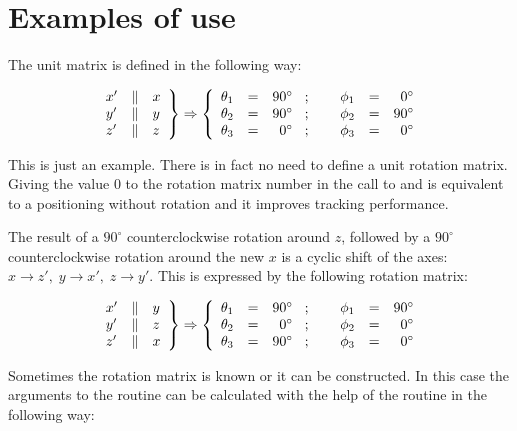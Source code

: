 \section*{Examples of use}
The unit matrix is defined in the following way:

\[
\left . \begin{array}{lcl}
x' & \| & x \\
y' & \| & y \\
z' & \| & z
\end{array} \right \}
\Rightarrow
\left \{
\begin{array}{lcr@{\mbox{\hspace{3mm};\hspace{8mm}}}lcr}
\theta_1 & = & 90^{\circ} & \phi_1 & = & 0^{\circ} \\
\theta_2 & = & 90^{\circ} & \phi_2 & = & 90^{\circ} \\
\theta_3 & = & 0^{\circ} & \phi_3 & = & 0^{\circ} 
\end{array} \right .
\]

This is just an example. There is in fact no need to define a unit rotation
matrix. Giving the value 0 to the rotation matrix number in the call to
 and  is equivalent to a positioning without 
rotation and it improves tracking performance.

The result of a $90^{\circ}$ counterclockwise rotation around $z$, followed
by a $90^{\circ}$ counterclockwise rotation around the new $x$ is a cyclic
shift of the axes: $x \rightarrow z', \; y \rightarrow x', \; z \rightarrow  
y'$. This is expressed by the following rotation matrix:

\[
\left . \begin{array}{lcl}
x' & \| & y \\
y' & \| & z \\
z' & \| & x
\end{array} \right \}
\Rightarrow
\left \{
\begin{array}{lcr@{\mbox{\hspace{3mm};\hspace{8mm}}}lcr}
\theta_1 & = & 90^{\circ} & \phi_1 & = & 90^{\circ} \\
\theta_2 & = & 0^{\circ} & \phi_2 & = & 0^{\circ} \\
\theta_3 & = & 90^{\circ} & \phi_3 & = & 0^{\circ} 
\end{array} \right .
\]

Sometimes the rotation matrix is known or it can be constructed. In this case
the arguments to the routine  can be calculated with the help
of the routine  in the following way:

